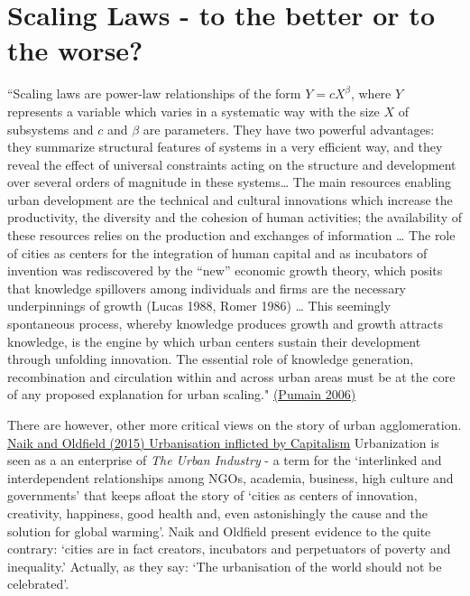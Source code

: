 \documentclass[
]{book}
\begin{document}
\hypertarget{scaling-laws---to-the-better-or-to-the-worse}{%
\section{Scaling Laws - to the better or to the worse?}\label{scaling-laws---to-the-better-or-to-the-worse}}

``Scaling laws are power-law relationships of the form \(Y = cX^β\), where \(Y\) represents a
variable which varies in a systematic way with the size \(X\) of subsystems and \(c\) and \(β\) are
parameters. They have two powerful advantages: they summarize structural features of
systems in a very efficient way, and they reveal the effect of universal constraints acting
on the structure and development over several orders of magnitude in these systems\ldots{}
The main resources enabling urban
development are the technical and cultural innovations which increase the productivity,
the diversity and the cohesion of human activities; the availability of these resources
relies on the production and exchanges of information \ldots{}
The role of cities as centers for the integration of human capital and as incubators
of invention was rediscovered by the ``new'' economic growth theory, which posits that
knowledge spillovers among individuals and firms are the necessary underpinnings of
growth (Lucas 1988, Romer 1986) \ldots{}
This seemingly spontaneous
process, whereby knowledge produces growth and growth attracts knowledge, is the
engine by which urban centers sustain their development through unfolding innovation.
The essential role of knowledge generation, recombination and circulation within and
across urban areas must be at the core of any proposed explanation for urban scaling."
\href{https://journals.openedition.org/cybergeo/2519}{(Pumain 2006)}

There are however, other more critical views on the story of urban agglomeration.
\href{https://www.citymetric.com/horizons/urbanisation-not-natural-or-inevitable-its-being-inflicted-upon-us-forces-capitalism-900}{Naik and Oldfield (2015) Urbanisation inflicted by Capitalism}
Urbanization is seen as a an enterprise of \emph{The Urban Industry} - a term for the
`interlinked and interdependent relationships among NGOs, academia, business, high culture and governments' that keeps afloat the story of `cities as centers of innovation, creativity, happiness, good health and, even astonishingly the cause and the solution for global warming'. Naik and Oldfield
present evidence to the quite contrary: `cities are in fact creators, incubators and perpetuators of poverty and inequality.' Actually, as they say: `The urbanisation of the world should not be celebrated'.
\end{document}
